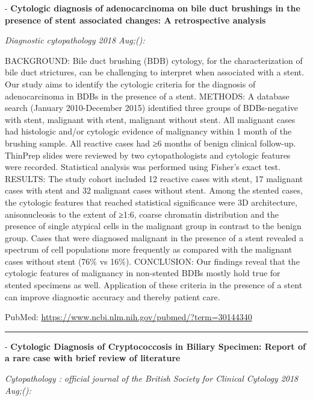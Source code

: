 \documentclass[]{article}
\begin{document}
 - \textbf{Cytologic diagnosis of adenocarcinoma on bile duct brushings
in the presence of stent associated changes: A retrospective analysis}

\emph{Diagnostic cytopathology 2018 Aug;():}

BACKGROUND: Bile duct brushing (BDB) cytology, for the characterization
of bile duct strictures, can be challenging to interpret when associated
with a stent. Our study aims to identify the cytologic criteria for the
diagnosis of adenocarcinoma in BDBs in the presence of a stent. METHODS:
A database search (January 2010-December 2015) identified three groups
of BDBs-negative with stent, malignant with stent, malignant without
stent. All malignant cases had histologic and/or cytologic evidence of
malignancy within 1 month of the brushing sample. All reactive cases had
≥6 months of benign clinical follow-up. ThinPrep slides were reviewed by
two cytopathologists and cytologic features were recorded. Statistical
analysis was performed using Fisher's exact test. RESULTS: The study
cohort included 12 reactive cases with stent, 17 malignant cases with
stent and 32 malignant cases without stent. Among the stented cases, the
cytologic features that reached statistical significance were 3D
architecture, anisonucleosis to the extent of ≥1:6, coarse chromatin
distribution and the presence of single atypical cells in the malignant
group in contrast to the benign group. Cases that were diagnosed
malignant in the presence of a stent revealed a spectrum of cell
populations more frequently as compared with the malignant cases without
stent (76\% vs 16\%). CONCLUSION: Our findings reveal that the cytologic
features of malignancy in non-stented BDBs mostly hold true for stented
specimens as well. Application of these criteria in the presence of a
stent can improve diagnostic accuracy and thereby patient care.

PubMed: \url{https://www.ncbi.nlm.nih.gov/pubmed/?term=30144340}

{}

{}

\begin{center}\rule{0.5\linewidth}{\linethickness}\end{center}

 - \textbf{Cytologic Diagnosis of Cryptococcosis in Biliary Specimen:
Report of a rare case with brief review of literature}

\emph{Cytopathology : official journal of the British Society for
Clinical Cytology 2018 Aug;():}
\end{document}
